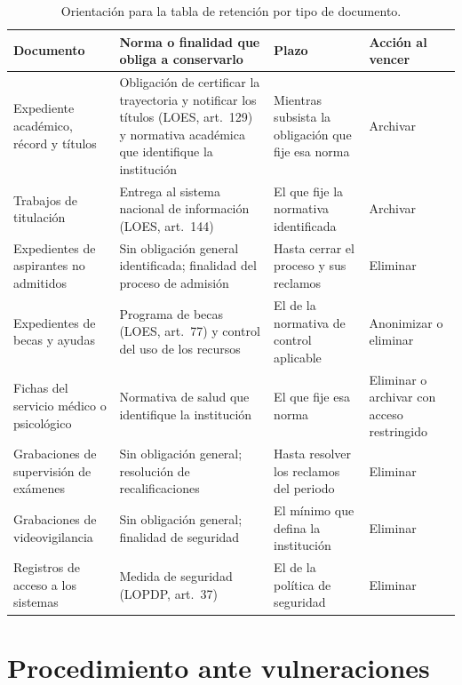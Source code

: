 \begin{table}[htbp]
\centering
\caption{Orientación para la tabla de retención por tipo de documento.}
\label{tab:retencion}
\scriptsize
\renewcommand{\arraystretch}{1.15}
\begin{tabularx}{\textwidth}{|>{\raggedright\arraybackslash}p{3.0cm}|L|>{\raggedright\arraybackslash}p{3.2cm}|>{\raggedright\arraybackslash}p{1.8cm}|}
  \hline
  \textbf{Documento} & \textbf{Norma o finalidad que obliga a conservarlo} & \textbf{Plazo} & \textbf{Acción al vencer} \\
  \hline
  Expediente académico, récord y títulos & Obligación de certificar la trayectoria y notificar los títulos (LOES, art.~129) y normativa académica que identifique la institución & Mientras subsista la obligación que fije esa norma & Archivar \\ \hline
  Trabajos de titulación & Entrega al sistema nacional de información (LOES, art.~144) & El que fije la normativa identificada & Archivar \\ \hline
  Expedientes de aspirantes no admitidos & Sin obligación general identificada; finalidad del proceso de admisión & Hasta cerrar el proceso y sus reclamos & Eliminar \\ \hline
  Expedientes de becas y ayudas & Programa de becas (LOES, art.~77) y control del uso de los recursos & El de la normativa de control aplicable & Anonimizar o eliminar \\ \hline
  Fichas del servicio médico o psicológico & Normativa de salud que identifique la institución & El que fije esa norma & Eliminar o archivar con acceso restringido \\ \hline
  Grabaciones de supervisión de exámenes & Sin obligación general; resolución de recalificaciones & Hasta resolver los reclamos del periodo & Eliminar \\ \hline
  Grabaciones de videovigilancia & Sin obligación general; finalidad de seguridad & El mínimo que defina la institución & Eliminar \\ \hline
  Registros de acceso a los sistemas & Medida de seguridad (LOPDP, art.~37) & El de la política de seguridad & Eliminar \\ \hline
\end{tabularx}
\raggedright
{}
\end{table}

\section{Procedimiento ante vulneraciones}
\label{sec:guia_vulneraciones}

